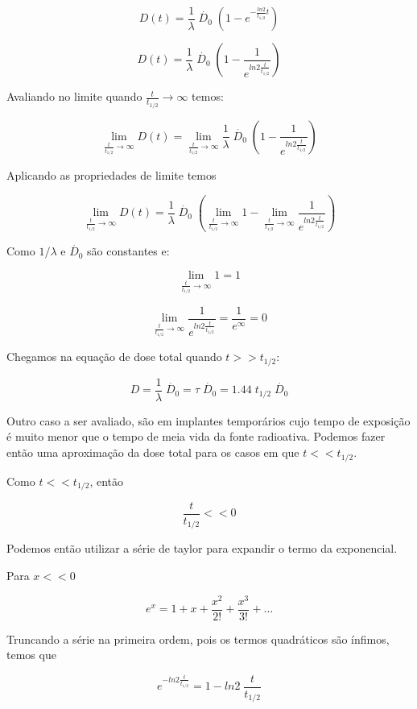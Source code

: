 \documentclass[11pt,a4paper]{article}
\begin{document}
			$$ D(t) = \frac{1}{\lambda}  \; \dot{D_0} \; \left(1 - e^{-\frac{ln 2}{t_{1/2}} t}\right) $$

			$$D(t) = \frac{1}{\lambda}  \; \dot{D_0} \; \left(1 - \frac{1}{e^{ln 2 \frac{t}{t_{1/2}}}}\right)$$

			Avaliando no limite quando $\frac{t}{t_{1/2}} \rightarrow \infty$ temos:

			$$ \lim_{{\frac{t}{t_{1/2}}} \to \infty} D(t) = \lim_{{\frac{t}{t_{1/2}}} \to \infty} \frac{1}{\lambda}  \; \dot{D_0} \; \left(1 - \frac{1}{e^{ln 2 \frac{t}{t_{1/2}}}}\right)$$

			Aplicando as propriedades de limite temos

			$$\lim_{{\frac{t}{t_{1/2}}} \to \infty} D(t) = \frac{1}{\lambda} \; \dot{D_0} \;  \left(\lim_{{\frac{t}{t_{1/2}}} \to \infty} 1 - \lim_{{\frac{t}{t_{1/2}}} \to \infty} \frac{1}{e^{ln 2 \frac{t}{t_{1/2}}}}\right)$$

			Como $1/ \lambda$ e $\dot{D_0}$ são constantes e:

			$$\lim_{{\frac{t}{t_{1/2}}} \to \infty} 1 = 1$$

			$$\lim_{{\frac{t}{t_{1/2}}} \to \infty} \frac{1}{e^{ln 2 \frac{t}{t_{1/2}}}} = \frac{1}{e^{\infty}} = 0 $$

			Chegamos na equação de dose total quando $t >> t_{1/2}$:

			\begin{equation}
				D = \frac{1}{\lambda} \; \dot{D_0} = \tau \; \dot{D_0} = 1.44 \; t_{1/2} \; \dot{D_0}
				\label{eq:aproximacaoImplantesPermanentes}
			\end{equation}


			Outro caso a ser avaliado, são em implantes temporários cujo tempo de exposição é muito menor que o tempo de meia vida da fonte radioativa. Podemos fazer então uma aproximação da dose total para os casos em que $t << t_{1/2}$. 


			Como $t << t_{1/2}$, então

			$$\frac{t}{t_{1/2}} << 0 $$

			Podemos então utilizar a série de taylor para expandir o termo da exponencial. 

			Para $x << 0$

			$$e^x = 1 + x + \frac{x^2}{2!} + \frac{x^3}{3!} + \dots$$

			Truncando a série na primeira ordem, pois os termos quadráticos são ínfimos, temos que

			$$ e^{-ln 2 \frac{t}{t_{1/2}}} = 1 - ln 2 \; \frac{t}{t_{1/2}}$$
\end{document}

